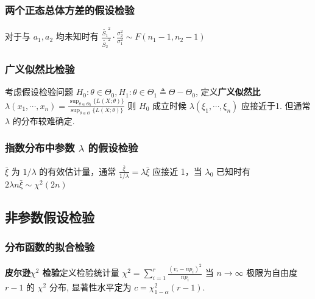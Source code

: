 \documentclass[10pt]{yerbaformat}
\begin{document}
\subsubsection{两个正态总体方差的假设检验}

\par 对于与 $a_{1}, a_{2}$ 均未知时有 $\frac{\widetilde{S_{1}}^{2}}{\widetilde{S_{2}}^{2}} \cdot \frac{\sigma_{2}^{2}}{\sigma_{1}^{2}} \sim F\left(n_{1}-1, n_{2}-1\right)$


\subsubsection{广义似然比检验}

\par 考虑假设检验问题 $H_{0}: \theta \in \Theta_{0}, H_{1}: \theta \in \Theta_{1} \triangleq \Theta-\Theta_{0}$, 定义\textbf{广义似然比} $\lambda\left(x_{1}, \cdots, x_{n}\right)=\frac{\sup _{\theta \in \Theta_{0}}\{L(X ; \theta)\}}{\sup _{\theta \in \Theta}\{L(X ; \theta)\}}$ 则 $H_{0}$ 成立时候 $\lambda\left(\xi_{1}, \cdots, \xi_{n}\right)$ 应接近于1. 但通常 $\lambda$ 的分布较难确定.

\subsubsection{指数分布中参数 $\lambda$ 的假设检验}

\par $\bar{\xi}$ 为 $1 / \lambda$ 的有效估计量，通常 $\frac{\bar{\xi}}{1 / \lambda}=\lambda \bar{\xi}$ 应接近 1，当 $\lambda_{0}$ 已知时有 $2 \lambda n \bar{\xi} \sim \chi^{2}(2 n)$

\subsection{非参数假设检验}

\subsubsection{分布函数的拟合检验}

\par \textbf{皮尔逊$\chi^{2}$ 检验}定义检验统计量 $\chi^{2}=\sum_{i=1}^{r} \frac{\left(v_{i}-n p_{i}\right)^{2}}{n p_{i}}$ 当 $n \rightarrow \infty$ 极限为自由度 $r-1$ 的 $\chi^2$ 分布, 显著性水平定为 $c=\chi_{1-\alpha}^{2}(r-1)$.
\end{document}
